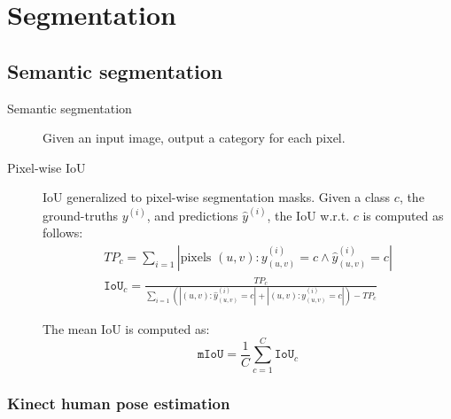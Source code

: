 \chapter{Segmentation}


\section{Semantic segmentation}

\begin{description}
    \item[Semantic segmentation] 
        Given an input image, output a category for each pixel.

    \item[Pixel-wise IoU] 
        IoU generalized to pixel-wise segmentation masks. Given a class $c$, the ground-truths $y^{(i)}$, and predictions $\hat{y}^{(i)}$, the IoU w.r.t. $c$ is computed as follows:
        \[
            \begin{gathered}
                TP_c = \sum_{i=1} | \text{pixels $(u, v): y_{(u, v)}^{(i)} = c \land \hat{y}_{(u, v)}^{(i)} = c$} | \\
                \texttt{IoU}_c = \frac{TP_c}{\sum_{i=1} \left( | (u, v): \hat{y}_{(u, v)}^{(i)} = c | + | (u, v): y_{(u, v)}^{(i)} = c | \right) - TP_c}
            \end{gathered}
        \]

        The mean IoU is computed as:
        \[ \texttt{mIoU} = \frac{1}{C} \sum_{c=1}^{C} \texttt{IoU}_c \]
\end{description}


\subsection{Kinect human pose estimation}

